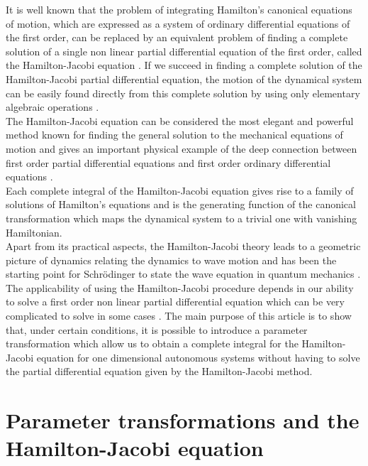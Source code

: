 It is well known that the problem of integrating Hamilton's
canonical equations of motion, which are expressed as a system of
ordinary differential equations of the first order, can be
replaced by an equivalent problem of finding a complete solution
of a single non linear partial differential equation of the first
order, called the Hamilton-Jacobi equation \cite{B1}. If we
succeed in finding a complete solution of the Hamilton-Jacobi
partial differential equation, the motion of the dynamical system
can be easily found directly from this complete solution by using
only elementary algebraic operations \cite{Vu}. \\
The Hamilton-Jacobi equation can be considered the
most elegant and powerful method known for finding the general
solution to the mechanical equations of motion and gives an
important physical example of the deep connection between first
order partial differential equations and first order ordinary
differential equations \cite{Vi}. \\
Each complete integral of the Hamilton-Jacobi equation gives rise
to a family of solutions of Hamilton's equations and is the
generating function of the canonical transformation which maps the
dynamical system to a trivial one with vanishing Hamiltonian. \\
Apart from its practical aspects, the Hamilton-Jacobi theory leads
to a geometric picture of dynamics relating the dynamics to wave
motion and has been the starting point for Schr\"{o}dinger to
state the wave equation in quantum mechanics \cite{Co}. \\
The applicability of using the Hamilton-Jacobi procedure depends
in our ability to solve a first order non linear partial
differential equation which can be very complicated to solve in
some cases \cite{GLo}. The main purpose of this article is to show
that, under certain conditions, it is possible to introduce a
parameter transformation which allow us to obtain a complete
integral for the Hamilton-Jacobi equation for one dimensional
autonomous systems without having to solve the partial
differential equation given by the Hamilton-Jacobi method.

\section{Parameter transformations and the Hamilton-Jacobi equation}

